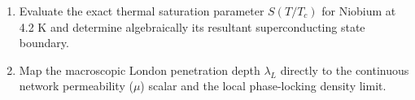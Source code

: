 \begin{exercisebox}
\begin{enumerate}
    \item Evaluate the exact thermal saturation parameter $S(T/T_c)$ for Niobium at 4.2 K and determine algebraically its resultant superconducting state boundary.
    \item Map the macroscopic London penetration depth $\lambda_L$ directly to the continuous network permeability ($\mu$) scalar and the local phase-locking density limit.
\end{enumerate}
\end{exercisebox}

